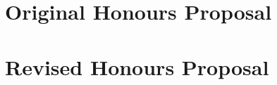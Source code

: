 \documentclass[../thesis/thesis.tex]{subfiles}
\begin{document}
\chapter{Original Honours Proposal}
\label{chap:appendix:original_proposal}


\chapter{Revised Honours Proposal}
\label{chap:appendix:revised_proposal}

\end{document}

